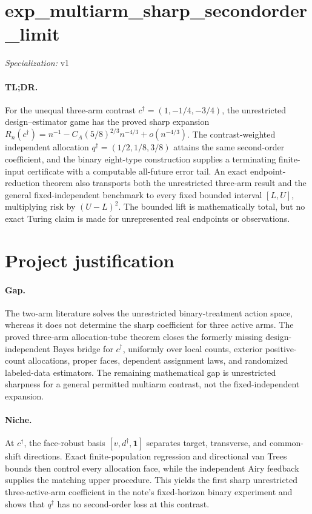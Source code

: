 \documentclass{article}
\begin{document}
\sloppy

\section*{exp\_\allowbreak{}multiarm\_\allowbreak{}sharp\_\allowbreak{}secondorder\_\allowbreak{}limit}

\noindent\textit{Specialization:} v1\par

\paragraph{TL;DR.} For the unequal three-arm contrast \(c^\dagger=(1,-1/4,-3/4)\), the unrestricted design--estimator game has the proved sharp expansion \(R_n(c^\dagger)=n^{-1}-C_A(5/8)^{2/3}n^{-4/3}+o(n^{-4/3})\). The contrast-weighted independent allocation \(q^\dagger=(1/2,1/8,3/8)\) attains the same second-order coefficient, and the binary eight-type construction supplies a terminating finite-input certificate with a computable all-future error tail. An exact endpoint-reduction theorem also transports both the unrestricted three-arm result and the general fixed-independent benchmark to every fixed bounded interval \([L,U]\), multiplying risk by \((U-L)^2\). The bounded lift is mathematically total, but no exact Turing claim is made for unrepresented real endpoints or observations.

\section{Project justification}

\paragraph{Gap.} The two-arm literature solves the unrestricted binary-treatment action space, whereas it does not determine the sharp coefficient for three active arms. The proved three-arm allocation-tube theorem closes the formerly missing design-independent Bayes bridge for \(c^\dagger\), uniformly over local counts, exterior positive-count allocations, proper faces, dependent assignment laws, and randomized labeled-data estimators. The remaining mathematical gap is unrestricted sharpness for a general permitted multiarm contrast, not the fixed-independent expansion.

\paragraph{Niche.} At \(c^\dagger\), the face-robust basis \([v,d^\dagger,\mathbf 1]\) separates target, transverse, and common-shift directions. Exact finite-population regression and directional van Trees bounds then control every allocation face, while the independent Airy feedback supplies the matching upper procedure. This yields the first sharp unrestricted three-active-arm coefficient in the note's fixed-horizon binary experiment and shows that \(q^\dagger\) has no second-order loss at this contrast.
\end{document}
